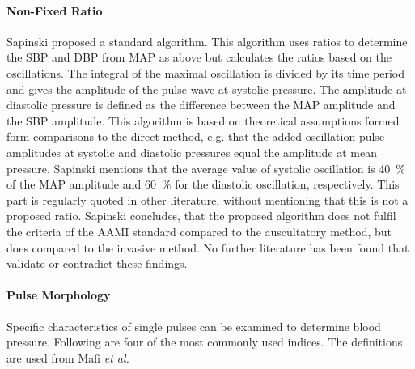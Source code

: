 \paragraph{Non-Fixed Ratio}Sapinski \cite{Sapinski1996} proposed a standard algorithm. This algorithm uses ratios to determine the SBP and DBP from MAP as above but calculates the ratios based on the oscillations. The integral of the maximal oscillation is divided by its time period and gives the amplitude of the pulse wave at systolic pressure. The amplitude at diastolic pressure is defined as the difference between the MAP amplitude and the SBP amplitude. This algorithm is based on theoretical assumptions formed form comparisons to the direct method, e.g. that the added oscillation pulse amplitudes at systolic and diastolic pressures equal the amplitude at mean pressure. Sapinski mentions that the average value of systolic oscillation is \SI{40}{\%} of the MAP amplitude and \SI{60}{\%} for the diastolic oscillation, respectively. This part is regularly quoted in other literature, without mentioning that this is not a proposed ratio. Sapinski concludes, that the proposed algorithm does not fulfil the criteria of the AAMI standard compared to the auscultatory method, but does compared to the invasive method. No further literature has been found that validate or contradict these findings.


\paragraph{Pulse Morphology} Specific characteristics of single pulses can be examined to determine blood pressure. Following are four of the most commonly used indices. The definitions are used from Mafi \textit{et al.}\cite{Mafi2011}


